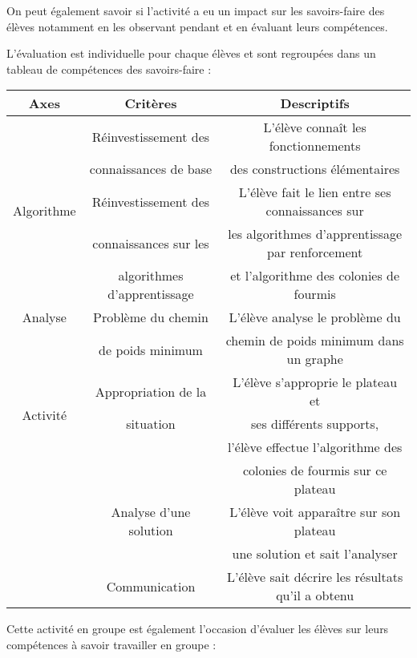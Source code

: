 \documentclass[
12pt,
french,
]{article}
\begin{document}
On peut également savoir si l'activité a eu un impact sur les
savoirs-faire des élèves notamment en les observant pendant et en
évaluant leurs compétences.

L'évaluation est individuelle pour chaque élèves et sont regroupées dans
un tableau de compétences des savoirs-faire :

\begin{tabular}{|c|c|c|}  
\hline   
Axes&Critères&Descriptifs\\
\hline   
\multirow{5}{*}{Algorithme}&
Réinvestissement des
&L'élève connaît les fonctionnements \\
&connaissances de base
& des constructions élémentaires\\

\cline{2-3}

&Réinvestissement des
&L'élève fait le lien entre ses connaissances sur\\
&connaissances sur les
&les algorithmes d'apprentissage par renforcement \\
&algorithmes d'apprentissage
&et l'algorithme des colonies de fourmis\\

\hline

Analyse&Problème du chemin
&L'élève analyse le problème du\\
&de poids minimum
&chemin de poids minimum dans un graphe\\

\hline
\multirow{3}{*}{Activité}
&Appropriation de la
&L'élève s'approprie le plateau et \\
&situation
&ses différents supports,\\
& &l'élève effectue l'algorithme des\\
& &colonies de fourmis sur ce plateau\\

\cline{2-3}

&Analyse d'une solution
&L'élève voit apparaître sur son plateau\\
& &une solution et sait l'analyser\\

\cline{2-3}

&Communication
&L'élève sait décrire les résultats qu'il a obtenu\\

\hline
\end{tabular}

Cette activité en groupe est également l'occasion d'évaluer les élèves
sur leurs compétences à savoir travailler en groupe :
\end{document}
